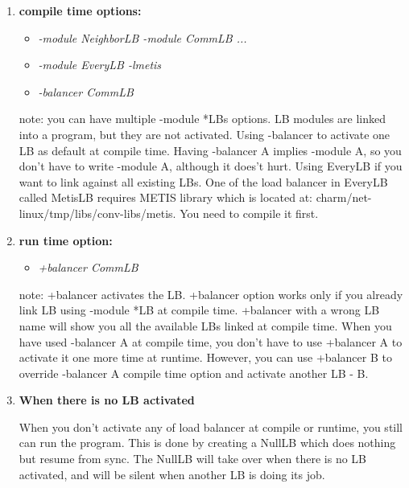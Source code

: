 \begin{enumerate}
\item {\bf compile time options:}

\begin{itemize}
\item {\em -module NeighborLB -module CommLB ...}
\item {\em -module EveryLB -lmetis}
\item {\em -balancer CommLB}
\end{itemize}

note:
you can have multiple -module *LBs options. LB modules are
linked into a program, but they are not activated.
Using -balancer to activate one LB as default at compile time. Having -balancer A implies -module A, so you don't have to write -module A, although it does't hurt.
Using EveryLB if you want to link against all existing LBs. One of the load balancer in EveryLB called MetisLB requires METIS library which is located at: charm/net-linux/tmp/libs/conv-libs/metis. You need to compile it first.

\item {\bf run time option:}

\begin{itemize}
\item {\em +balancer CommLB}
\end{itemize}

note:
+balancer activates the LB. +balancer option works only if you already link LB using -module *LB at compile time. +balancer with a wrong LB name will show you all the available LBs linked at compile time.
When you have used -balancer A at compile time, you don't have to use +balancer A to activate it one more time at runtime. However, you can use +balancer B to override -balancer A compile time option and activate another LB - B.

\item {\bf When there is no LB activated}

When you don't activate any of load balancer at compile or runtime, you still 
can run the program. This is done by creating a NullLB which does nothing 
but resume from sync. The NullLB will take over when there is
no LB activated, and will be silent when another LB is doing its job. 

\end{enumerate}


